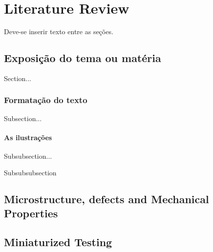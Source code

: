 \chapter{Literature Review}\label{cap:literatureReview}
Deve-se inserir texto entre as seções.

\section{Exposição do tema ou matéria}

Section...

\subsection{Formatação do texto}

Subsection...

\subsubsection{As ilustrações}

Subsubsection...


Subsubsubsection


\section{Microstructure, defects and Mechanical Properties}

%


\section{Miniaturized Testing}


